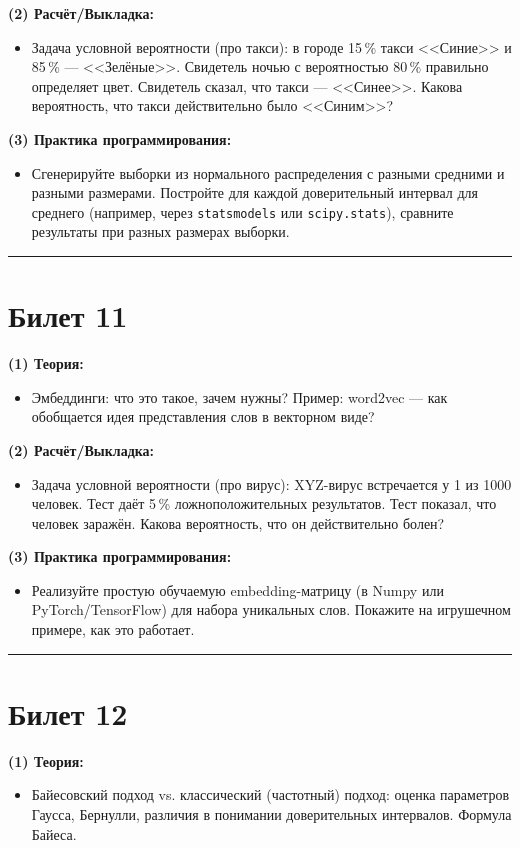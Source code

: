 \documentclass[a4paper,12pt]{article}
\begin{document}
\textbf{(2) Расчёт/Выкладка:}
\begin{itemize}
  \item Задача условной вероятности (про такси): в городе 15\,\% такси <<Синие>> и 85\,\% --- <<Зелёные>>. Свидетель ночью с вероятностью 80\,\% правильно определяет цвет. Свидетель сказал, что такси --- <<Синее>>. Какова вероятность, что такси действительно было <<Синим>>?
\end{itemize}

\textbf{(3) Практика программирования:}
\begin{itemize}
  \item Сгенерируйте выборки из нормального распределения с разными средними и разными размерами. Постройте для каждой доверительный интервал для среднего (например, через \texttt{statsmodels} или \texttt{scipy.stats}), сравните результаты при разных размерах выборки.
\end{itemize}

\noindent\rule{\textwidth}{0.4pt}
\newpage

\section*{Билет 11}
\textbf{(1) Теория:}
\begin{itemize}
  \item Эмбеддинги: что это такое, зачем нужны? Пример: word2vec --- как обобщается идея представления слов в векторном виде?
\end{itemize}

\textbf{(2) Расчёт/Выкладка:}
\begin{itemize}
  \item Задача условной вероятности (про вирус): XYZ-вирус встречается у 1 из 1000 человек. Тест даёт 5\,\% ложноположительных результатов. Тест показал, что человек заражён. Какова вероятность, что он действительно болен?
\end{itemize}

\textbf{(3) Практика программирования:}
\begin{itemize}
  \item Реализуйте простую обучаемую embedding-матрицу (в Numpy или PyTorch/TensorFlow) для набора уникальных слов. Покажите на игрушечном примере, как это работает.
\end{itemize}

\noindent\rule{\textwidth}{0.4pt}

\section*{Билет 12}
\textbf{(1) Теория:}
\begin{itemize}
  \item Байесовский подход vs. классический (частотный) подход: оценка параметров Гаусса, Бернулли, различия в понимании доверительных интервалов. Формула Байеса.
\end{itemize}
\end{document}
